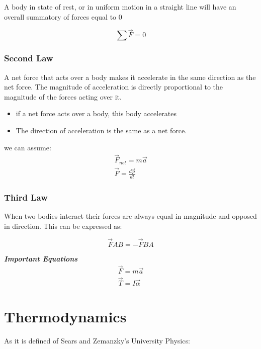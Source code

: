 \documentclass[11pt,fleqn]{book} %
\begin{document}
A body in state of rest, or in uniform motion in a straight line
will have an overall summatory of forces equal to 0

\begin{equation}
    \sum \vec{F} = 0
\end{equation}

\subsection{Second Law}

A net force that acts over a body makes it accelerate in the same direction
as the net force. The magnitude of acceleration is directly proportional
to the magnitude of the forces acting over it.

\begin{itemize}
    \item if a net force acts over a body, this body accelerates
    \item The direction of acceleration is the same as a net force.
\end{itemize}

we can assume:
\begin{gather}
    \vec{F}_{net} = m \vec{a} \\
    \vec{F} = \frac{d \vec{p}}{dt} 
\end{gather}

\subsection{Third Law}

When two bodies interact their forces are always equal in magnitude and
opposed in direction. This can be expressed as:

\begin{equation}
    \vec{F} AB = - \vec{F} BA
\end{equation}

\textit{\textbf{Important Equations}}
\begin{gather}
    \vec{F} = m\vec{a}\\
    \vec{T} = I\vec{\alpha}
\end{gather}

\chapter{Thermodynamics}

As it is defined of Sears and Zemanzky's University Physics:
\end{document}

